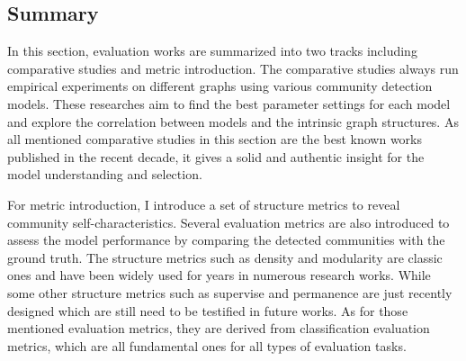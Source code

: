 \subsection{Summary}
In this section, evaluation works are summarized into two tracks including comparative studies and metric introduction. The comparative studies always run empirical experiments on different graphs using various community detection models. These researches aim to find the best parameter settings for each model and explore the correlation between models and the intrinsic graph structures. As all mentioned comparative studies in this section are the best known works published in the recent decade, it gives a solid and authentic insight for the model understanding and selection. 

For metric introduction, I introduce a set of structure metrics to reveal community self-characteristics. Several evaluation metrics are also introduced to assess the model performance by comparing the detected communities with the ground truth. The structure metrics such as density and modularity are classic ones and have been widely used for years in numerous research works.  While some other structure metrics such as supervise and permanence are just recently designed which are still need to be testified in future works. As for those mentioned evaluation metrics, they are derived from classification evaluation metrics, which are all fundamental ones for all types of evaluation tasks. 